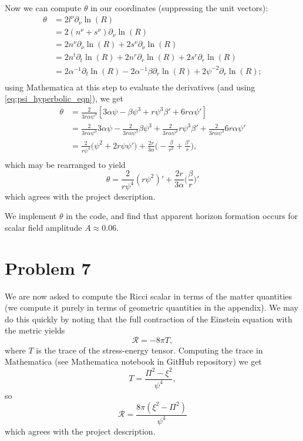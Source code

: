 \documentclass[12pt]{article}
\numberwithin{equation}{section}
\begin{document}
Now we can compute $\theta$ in our coordinates (suppressing the unit vectors):
\begin{equation}
\begin{aligned}
\theta &= 2 l^\nu \partial_\nu \ln(R) \\
&= 2 (n^\nu + s^\nu) \partial_\nu \ln(R) \\
&= 2 n^\nu \partial_\nu \ln(R) + 2 s^\nu \partial_\nu \ln(R) \\
&= 2 n^t \partial_t \ln(R) + 2 n^r \partial_r \ln(R) + 2 s^r \partial_r \ln(R) \\
&= 2 \alpha^{-1} \partial_t \ln(R) - 2 \alpha^{-1} \beta \partial_r \ln(R) + 2 \psi^{-2} \partial_r \ln(R); \\
\end{aligned}
\end{equation}
using Mathematica at this step to evaluate the derivatives (and using \ref{eq:psi_hyperbolic_eqn}), we get
\begin{equation}
\begin{aligned}
\theta &= \frac{2}{3 r \alpha \psi^3} [3 \alpha \psi - \beta \psi^3 + r \psi^3 \beta' + 6 r \alpha \psi'] \\
&= \frac{2}{3 r \alpha \psi^3} 3 \alpha \psi - \frac{2}{3 r \alpha \psi^3} \beta \psi^3 + \frac{2}{3 r \alpha \psi^3} r \psi^3 \beta' + \frac{2}{3 r \alpha \psi^3} 6 r \alpha \psi' \\
&= \frac{2}{r \psi^4} \Big( \psi^2 + 2 r \psi \psi' \Big) + \frac{2 r}{3 \alpha} \Big( - \frac{\beta}{r^2} + \frac{\beta'}{r} \Big), \\
\end{aligned}
\end{equation}
which may be rearranged to yield
\begin{equation}
\boxed{\theta = \frac{2}{r \psi^4} (r \psi^2)' + \frac{2 r}{3 \alpha} \Big( \frac{\beta}{r} \Big)' }
\end{equation}
which agrees with the project description.

We implement $\theta$ in the code, and find that apparent horizon formation occurs for scalar field amplitude $A \approx 0.06.$

\section{Problem 7}
We are now asked to compute the Ricci scalar in terms of the matter quantities (we compute it purely in terms of geometric quantities in the appendix).  We may do this quickly by noting that the full contraction of the Einstein equation with the metric yields
\begin{equation}
\mathcal{R} = - 8 \pi T,
\end{equation}
where $T$ is the trace of the stress-energy tensor.  Computing the trace in Mathematica (see Mathematica notebook in GitHub repository) we get
\begin{equation}
T = \frac{\Pi^2 - \xi^2}{\psi^4},
\end{equation}
so
\begin{equation}
\boxed{ \mathcal{R} = \frac{8 \pi (\xi^2 - \Pi^2)}{\psi^4} }
\end{equation}
which agrees with the project description.
\end{document}
